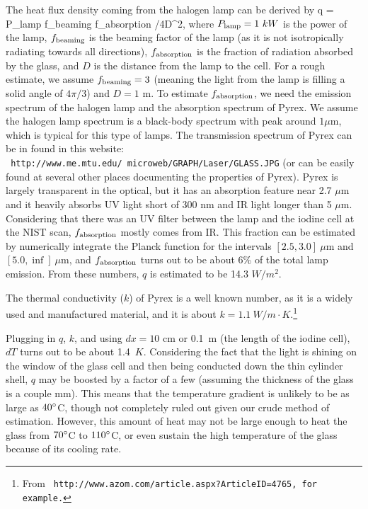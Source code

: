 The heat flux density coming from the halogen lamp can be derived by
\beq q = P_{\rm lamp} \cdot f_{\rm beaming} \cdot f_{\rm absorption}
/4\pi D^2, \eeq where $P_{\rm lamp}=1\ kW$ is the power of the lamp,
$f_{\rm beaming}$ is the beaming factor of the lamp (as it is not
isotropically radiating towards all directions), $f_{\rm absorption}$
is the fraction of radiation absorbed by the glass, and $D$ is the
distance from the lamp to the cell. For a rough estimate, we assume
$f_{\rm beaming}=3$ (meaning the light from the lamp is filling a
solid angle of $4\pi/3$) and $D=1$ m. To estimate $f_{\rm
absorption}$, we need the emission spectrum of the halogen lamp and
the absorption spectrum of Pyrex. We assume the halogen lamp spectrum
is a black-body spectrum with peak around $1 \mu$m, which is typical
for this type of lamps. The transmission spectrum of Pyrex can be in
found in this website: \\ {\tt
http://www.me.mtu.edu/~microweb/GRAPH/Laser/GLASS.JPG} (or can be
easily found at several other places documenting the properties of
Pyrex). Pyrex is largely transparent in the optical, but it has an
absorption feature near 2.7 $\mu$m and it heavily absorbs UV light
short of 300 nm and IR light longer than 5 $\mu$m. Considering that
there was an UV filter between the lamp and the iodine cell at the
NIST scan, $f_{\rm absorption}$ mostly comes from IR. This fraction
can be estimated by numerically integrate the Planck function for the
intervals $[2.5,3.0]\ \mu$m and $[5.0, \inf]\ \mu$m, and $f_{\rm
absorption}$ turns out to be about 6\% of the total lamp
emission. From these numbers, $q$ is estimated to be 14.3 $W/m^2$.

The thermal conductivity ($k$) of Pyrex is a well known number, as
it is a widely used and manufactured material, and it is about
$k=1.1\ W/m\cdot K$.\footnote{From {\tt
http://www.azom.com/article.aspx?ArticleID=4765, for example.}}

Plugging in $q$, $k$, and using $dx=10$ cm or 0.1~m (the length of the
iodine cell), $dT$ turns out to be about
1.4~$K$. Considering the fact that the light is shining on the window
of the glass cell and then being conducted down the thin cylinder
shell, $q$ may be boosted by a factor of a few
(assuming the thickness of the glass is a couple mm). This
means that the temperature gradient is unlikely to be as large
as $40^{\circ}$C, though not completely ruled out given our crude method of
estimation. However, this amount of heat may not be large enough to
heat the glass from $70^{\circ}$C to $110^{\circ}$C, or even sustain the
high temperature of the glass because of its cooling rate. 

